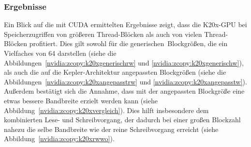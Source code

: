 \subsubsection{Ergebnisse}

Ein Blick auf die mit CUDA ermittelten Ergebnisse zeigt, dass die K20x-GPU bei
Speicherzugriffen von größeren Thread-Blöcken als auch von vielen Thread-Blöcken
profitiert. Dies gilt sowohl für die \glqq generischen\grqq\ Blockgrößen, die
ein Vielfaches von \num{64} darstellen (siehe die
Abbildungen~\ref{nvidia:zcopy:k20xgenerischrw} und
\ref{nvidia:zcopy:k20xgenerischw}), als auch die auf die Kepler-Architektur
angepassten Blockgrößen (siehe die
Abbildungen~\ref{nvidia:zcopy:k20xangepasstrw} und
\ref{nvidia:zcopy:k20xangepasstw}). Außerdem bestätigt sich die Annahme, dass
mit der angepassten Blockgröße eine etwas bessere Bandbreite erzielt werden kann
(siehe Abbildung~\ref{nvidia:zcopy:k20xvergleich}). Dies hilft insbesondere dem
kombinierten Lese- und Schreibvorgang, der dadurch bei einer großen Blockzahl
nahezu die selbe Bandbreite wie der reine Schreibvorgang erreicht (siehe
Abbildung~\ref{nvidia:zcopy:k20xrwwo}).

